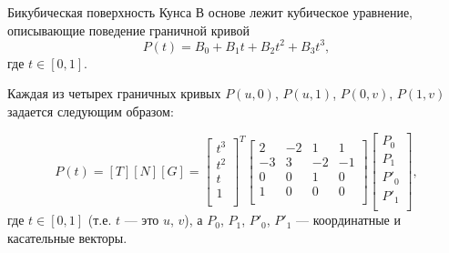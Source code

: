 \documentclass{beamer}
\begin{document}
		\begin{frame}{Бикубическая поверхность Кунса}
			В основе лежит кубическое уравнение, описывающие поведение граничной кривой
			\[
			P(t) = B_0 + B_1 t +B_2 t^2 +B_3 t^3
			,	
			\]
			где $t \in [0,1]$. 

			Каждая из четырех граничных кривых $P(u,0)$, $P(u,1)$, $P(0,v)$, $P(1,v)$ задается следующим образом:

			\[
				P(t) = [T][N][G] =
				\begin{bmatrix}
					t^3 \\
					t^2 \\
					t \\
					1 \\
				\end{bmatrix}^T
				\begin{bmatrix}
					2 & -2 & 1 & 1 \\
					-3 & 3 & -2 & -1 \\
					0 & 0 & 1 & 0 \\
					1 & 0 & 0 & 0 \\
				\end{bmatrix}
				\begin{bmatrix}
					P_0 \\
					P_1 \\
					P'_0 \\
					P'_1	\\
				\end{bmatrix}
				,
			\]
			где $t \in [0,1]$ (т.е. $t$ --- это $u$, $v$), а
			$P_0$, $P_1$, $P'_0$, $P'_1$ --- координатные и касательные векторы. 


		\end{frame}
\end{document}
